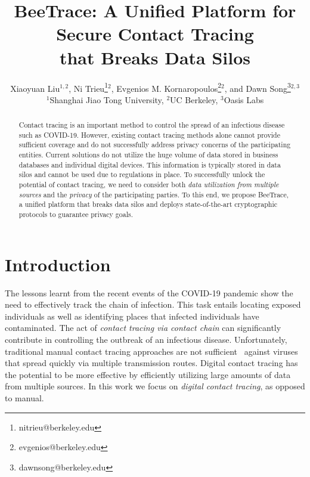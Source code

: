 \documentclass[11pt]{article}  %
\newcommand{\sysname}{\textsf{BeeTrace}\xspace}
\begin{document}
\title{\sysname: A Unified Platform for Secure Contact Tracing\\ that Breaks Data Silos}


\author{Xiaoyuan Liu$^{1,2}$, Ni Trieu\thanks{nitrieu@berkeley.edu}$^{2}$, Evgenios M. Kornaropoulos\thanks{evgenios@berkeley.edu}$^2$, and Dawn Song\thanks{dawnsong@berkeley.edu}$^{2,3}$ \\
$^1$Shanghai Jiao Tong University, $^2$UC Berkeley, $^3$Oasis Labs}

\maketitle

\begin{abstract}
    Contact tracing is an important method to control the spread of an infectious disease such as COVID-19. However, existing contact tracing methods alone cannot provide sufficient coverage and do not successfully address privacy concerns of the participating entities. Current solutions do not utilize the huge volume of data stored in business databases and individual digital devices. This information is typically stored in data silos and cannot be used due to regulations in place. To successfully unlock the potential of contact tracing, we need to consider both \emph{data utilization from multiple sources} and the \emph{privacy} of the participating parties. To this end, we propose \sysname, a unified platform that breaks data silos and deploys state-of-the-art cryptographic protocols to guarantee privacy goals. 
\end{abstract}

\section{Introduction}

The lessons learnt from the recent events of the COVID-19 pandemic show the need to effectively track the chain of infection.
This task entails locating exposed individuals as well as identifying places that infected individuals have contaminated. 
The act of \emph{contact tracing via contact chain} can  significantly contribute in controlling the outbreak of an infectious disease. Unfortunately, traditional manual contact tracing approaches are not sufficient~\cite{Farrahi2014} against viruses that spread quickly via multiple transmission routes.  Digital contact tracing has the potential to be more effective by efficiently utilizing large amounts of data from multiple sources. In this work we focus on \emph{digital contact tracing}, as opposed to manual.
\end{document}

